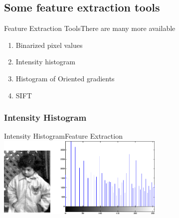 \documentclass{beamer}
\begin{document}

\subsection{Some feature extraction tools}
\begin{frame}{Feature Extraction Tools}{There are many more available}
\begin{enumerate}
\item Binarized pixel values
\item Intensity histogram 
\item Histogram of Oriented gradients
\item SIFT
\end{enumerate}
\end{frame}

\subsubsection{Intensity Histogram}
\begin{frame}{Intensity Histogram}{Feature Extraction}
\centering
    \includegraphics[width=80mm]{images/intensity.png}

\end{frame}
\end{document}
